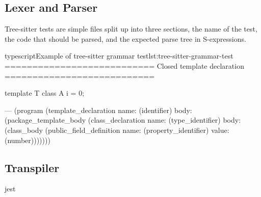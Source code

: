 \subsection{Lexer and Parser}\label{subsec:testing-lexer-and-parser}

Tree-sitter tests are simple  files split up into three sections, the name of the test, the code that should be parsed, and the expected parse tree in S-expressions\cite{sexprs}.

\begin{code}{typescript}{Example of tree-sitter grammar test}{lst:tree-sitter-grammar-test}
    ===========================
    Closed template declaration
    ===========================

    template T {
        class A {
            i = 0;
        }
    }

    ---
    (program
        (template_declaration
            name: (identifier)
            body: (package_template_body
                    (class_declaration
                        name: (type_identifier)
                        body: (class_body
                            (public_field_definition
                                name: (property_identifier)
                                value: (number)))))))

\end{code}

\subsection{Transpiler}\label{subsec:testing-transpiler}

jest